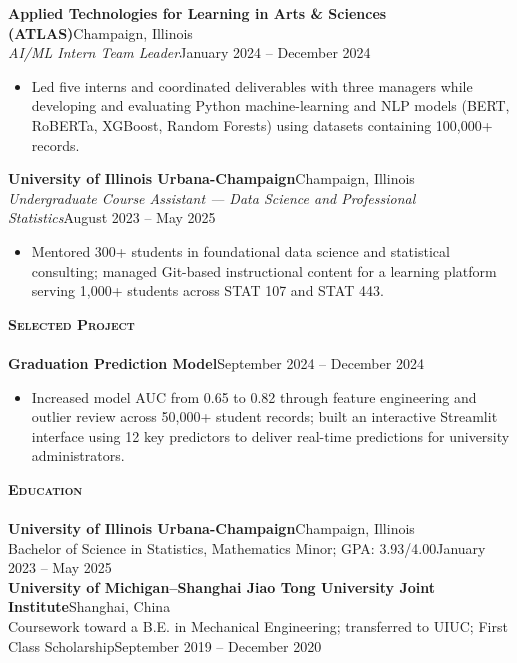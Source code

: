 \documentclass[a4paper]{article}
\newcommand{\lineunder}{
    \vspace*{-8pt} \\
    \hspace*{-18pt} \hrulefill \\
}
\newcommand{\header}[1]{
    \Needspace{4\baselineskip}
    {\hspace*{-18pt}\vspace*{5pt} \textsc{#1}}
    \vspace*{-6pt} \lineunder
}
\newcommand{\role}[4]{
    \Needspace{7\baselineskip}
    \vspace{2pt}
    \textbf{#1}\hfill #2\\
    \textit{#3}\hfill #4\\[-3pt]
}
\begin{document}
\role{Applied Technologies for Learning in Arts \& Sciences (ATLAS)}{Champaign, Illinois}
{AI/ML Intern Team Leader}{January 2024 -- December 2024}
\begin{itemize}[noitemsep]
  \item Led five interns and coordinated deliverables with three managers while developing and evaluating Python machine-learning and NLP models (BERT, RoBERTa, XGBoost, Random Forests) using datasets containing 100,000+ records.
\end{itemize}

\role{University of Illinois Urbana-Champaign}{Champaign, Illinois}
{Undergraduate Course Assistant --- Data Science and Professional Statistics}{August 2023 -- May 2025}
\begin{itemize}[noitemsep]
  \item Mentored 300+ students in foundational data science and statistical consulting; managed Git-based instructional content for a learning platform serving 1,000+ students across STAT 107 and STAT 443.
\end{itemize}

\vspace*{1mm}
\header{\textbf{Selected Project}}

\textbf{Graduation Prediction Model}\hfill September 2024 -- December 2024
\begin{itemize}[noitemsep]
  \item Increased model AUC from 0.65 to 0.82 through feature engineering and outlier review across 50,000+ student records; built an interactive Streamlit interface using 12 key predictors to deliver real-time predictions for university administrators.
\end{itemize}

\vspace*{1mm}
\header{\textbf{Education}}

\textbf{University of Illinois Urbana-Champaign}\hfill Champaign, Illinois\\
Bachelor of Science in Statistics, Mathematics Minor; GPA: 3.93/4.00\hfill January 2023 -- May 2025\\[-1pt]
\textbf{University of Michigan--Shanghai Jiao Tong University Joint Institute}\hfill Shanghai, China\\
Coursework toward a B.E. in Mechanical Engineering; transferred to UIUC; First Class Scholarship\hfill September 2019 -- December 2020\\[-1pt]
\end{document}
